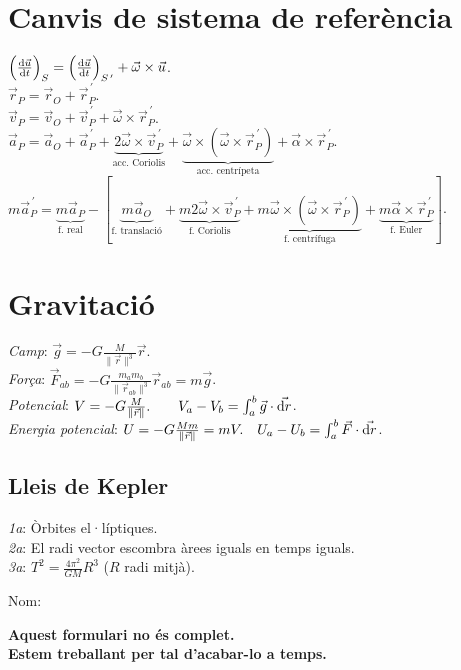 \documentclass[10pt]{article}
\newcommand{\lp}{\left(}
\newcommand{\rp}{\right)}
\newcommand{\ci}{\textbullet\;}
\begin{document}
\begin{multicols}{3}
\section{Canvis de sistema de referència}
\ci $\lp \frac{\dif \vec{u}}{\dif t} \rp_S=\lp \frac{\dif \vec{u}}{\dif t} \rp_{S^{\, \prime}}+\vec{\omega}\times \vec{u}$. \\
\ci $\vec{r}_P = \vec{r}_O + \vec{r}_{P}^{\, \prime}$. \\
\ci $\vec{v}_P = \vec{v}_O + \vec{v}_{P}^{\, \prime} + \vec{\omega}\times\vec{r}_{P}^{\, \prime}$. \\
\ci $\vec{a}_P = \vec{a}_O + \vec{a}_{P}^{\, \prime} + \underbrace{2\vec{\omega}\times\vec{v}_{P}^{\, \prime}}_{\text{acc. Coriolis}} + \underbrace{\vec{\omega}\times \lp \vec{\omega}\times \vec{r}_{P}^{\, \prime} \rp}_{\text{acc. centrípeta}} + \vec{\alpha}\times\vec{r}_{P}^{\, \prime}$. \\
\ci $m\vec{a}_{P}^{\, \prime} = \underbrace{m\vec{a}_P}_{\text{f. real}} - [ \underbrace{m\vec{a}_O}_{\text{f. translació}} + \underbrace{m2\vec{\omega}\times\vec{v}_{P}^{\, \prime}}_{\text{f. Coriolis}} + \underbrace{m\vec{\omega}\times \lp \vec{\omega}\times \vec{r}_{P}^{\, \prime} \rp}_{\text{f. centrífuga}} + \underbrace{m\vec{\alpha}\times\vec{r}_{P}^{\, \prime}}_{\text{f. Euler}} ]$.


\section{Gravitació}
\emph{Camp}: $\vec{g} = -G \frac{M}{\|\vec{r}\|^3} \vec{r}$. \\
\emph{Força}: $\vec{F}_{ab} = -G \frac{m_a m_b}{\|\vec{r}_{ab}\|^3} \vec{r}_{ab}=m\vec{g}$. \\
\emph{Potencial}: $V = -G \frac{M}{\|\vec{r}\|}. \qquad V_a-V_b = \int_a^b \vec{g} \cdot \vec{\dif r}$. \\
\emph{Energia potencial}: $U = -G \frac{Mm}{\|\vec{r}\|}=mV. \quad U_a-U_b = \int_a^b \vec{F} \cdot \vec{\dif r}$.

\subsection{Lleis de Kepler}
\emph{1a}: Òrbites el·líptiques. \\
\emph{2a}: El radi vector escombra àrees iguals en temps iguals. \\
\emph{3a}: $T^2=\frac{4\pi^2}{GM}R^3$ ($R$ radi mitjà).


\ifland
\noindent\makebox[\linewidth]{\rule{\linewidth}{0.5pt}}
\raggedleft
{\large Nom: \underline{\hspace{5cm}}}


\end{multicols}
\vspace*{\fill}
\begin{center}
\textbf{\huge Aquest formulari no \'es complet.} \\
\textbf{\huge Estem treballant per tal d'acabar-lo a temps.}
\end{center}
\vspace*{\fill}
\fi
\end{document}

